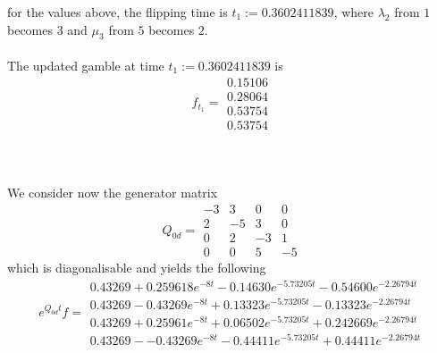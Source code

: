 \documentclass{article}
\begin{document}
for the values above, the flipping time is $t_{1}:= 0.3602411839$, where $\lambda_{2}$ from $1$ becomes $3$ and $\mu_{3}$ from $5$ becomes $2$.\\\\
The updated gamble at time $t_{1}:= 0.3602411839$ is
\begin{equation*} 
 f_{t_1}= 
 \begin{array}{|c|}
  0.15106\\
  0.28064\\
  0.53754\\
  0.53754  
 \end{array}
 \end{equation*}\\\\\\
We consider now the generator matrix 
\begin{equation*} 
 Q_{0d}= 
 \begin{array}{|rrrr|}
  -3 & 3 & 0 & 0 \\
  2 & -5 & 3 & 0 \\
  0 & 2 & -3 & 1 \\
  0 & 0 & 5 & -5 
 \end{array}
 \end{equation*}
which is diagonalisable and yields the following
\begin{equation*} 
 e^{Q_{0d}t}f= 
 \begin{array}{|r|}
  0.43269+0.259618e^{-8t}- 0.14630e^{-5.73205t}- 0.54600e^{-2.26794t}\\
  0.43269-0.43269e^{-8t}+ 0.13323e^{-5.73205t}- 0.13323e^{-2.26794t}\\
  0.43269+ 0.25961e^{-8t}+ 0.06502e^{-5.73205t} + 0.242669e^{-2.26794t}\\
  0.43269--0.43269e^{-8t}- 0.44411e^{-5.73205t}+ 0.44411e^{-2.26794t}  
 \end{array}
 \end{equation*}
\end{document}
